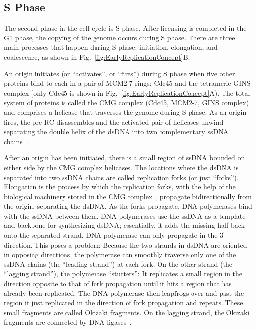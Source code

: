 		
		\subsection{S Phase}
		\label{subsec:SPhase}
		
		The second phase in the cell cycle is S phase.
		After licensing is completed in the G1 phase, the copying of the genome occurs during S phase.
		There are three main processes that happen during S phase: initiation, elongation, and coalescence, as shown in Fig.~\ref{fig:EarlyReplicationConcept}B.
		
		An origin initiates (or ``activates'', or ``fires'') during S phase when five other proteins bind to each in a pair of MCM2-7 rings:
		Cdc45 and the tetrameric GINS complex (only Cdc45 is shown in Fig.~\ref{fig:EarlyReplicationConcept}A).
		The total system of proteins is called the CMG complex (Cdc45, MCM2-7, GINS complex) and comprises a helicase that traverses the genome during S phase.
		As an origin fires, the pre-RC disassembles and the activated pair of helicases unwind, separating the double helix of the dsDNA into two complementary ssDNA chains~\cite{GINSComplex}.
		
		After an origin has been initiated, there is a small region of ssDNA bounded on either side by the CMG complex helicases.
		The locations where the dsDNA is separated into two ssDNA chains are called replication forks (or just ``forks'').
		Elongation is the process by which the replication forks, with the help of the biological machinery stored in the CMG complex~\cite{PurifiedProteins}, propagate bidirectionally from the origin, separating the dsDNA.
		As the forks propagate, DNA polymerases bind with the ssDNA between them.
		DNA polymerases use the ssDNA as a template and backbone for synthesizing dsDNA; essentially, it adds the missing half back onto the separated strand.
		DNA polymerase can only propagate in the $3^\prime$ direction.
		This poses a problem:
		Because the two strands in dsDNA are oriented in opposing directions, the polymerase can smoothly traverse only one of the ssDNA chains (the ``leading strand'') at each fork.
		On the other strand (the ``lagging strand''), the polymerase ``stutters'':
		It replicates a small region in the direction opposite to that of fork propagation until it hits a region that has already been replicated.
		The DNA polymerase then leapfrogs over and past the region it just replicated in the direction of fork propagation and repeats.
		These small fragments are called Okizaki fragments.
		On the lagging strand, the Okizaki fragments are connected by DNA ligases~\cite{MolecularCellBiology, CellMolApproach, OriginsReview}.
		

